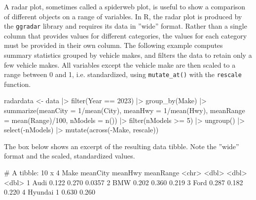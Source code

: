 

     



A radar plot, sometimes called a spiderweb plot, is useful to show a comparison of different objects on a range of variables. In R, the radar plot is produced by the \texttt{ggradar} library and requires its data in ''wide'' format. Rather than a single column that provides values for different categories, the values for each category must be provided in their own column. The following example computes summary statistics grouped by vehicle makes, and filters the data to retain only a few vehicle makes. All variables except the vehicle make are then scaled to a range between 0 and 1, i.e. standardized, using \texttt{mutate\_at()} with the \texttt{rescale} function.

\begin{samepage}
\begin{Rcode}
radardata <- data |>
  filter(Year == 2023) |> group_by(Make) |>
  summarize(meanCity = 1/mean(City), 
            meanHwy = 1/mean(Hwy), 
            meanRange = mean(Range)/100, 
            nModels = n()) |>
  filter(nModels >= 5) |> ungroup() |>
  select(-nModels) |>
  mutate(across(-Make, rescale))
\end{Rcode}
\end{samepage}

The box below shows an excerpt of the resulting data tibble. Note the ''wide'' format and the scaled, standardized values. 

\begin{samepage}
\begin{textcode}
# A tibble: 10 x 4
   Make          meanCity meanHwy meanRange
   <chr>            <dbl>   <dbl>     <dbl>
 1 Audi            0.122    0.270    0.0357
 2 BMW             0.202    0.360    0.219 
 3 Ford            0.287    0.182    0.220 
 4 Hyundai         1        0.630    0.260 
\end{textcode}
\end{samepage}

